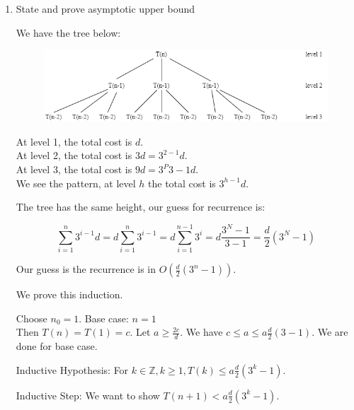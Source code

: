 \documentclass{cpsc413Solutions}
\begin{document}
\begin{problemlist}
\begin{problem}
\begin{problem}
\begin{answer}
\begin{enumerate}
    which means:
    \begin{align*}
    T[i,j] = 
        \begin{cases}
         c  &\text{if $j=1$}\\
        \\
       3T(n-1) + d & \text{otherwise}
        \end{cases}
    \end{align*}
    
    \newpage
    \item State and prove asymptotic upper bound
    
    We have the tree below:
    \begin{figure}[htp]
        \centering
        \includegraphics[width=15cm]{ProbSet6.png}
    \end{figure}
    
    At level 1, the total cost is $d$.\\
    At level 2, the total cost is $3d = 3^{2-1}d$.\\
    At level 3, the total cost is $9d = 3^P{3-1}d$.\\
    
    We see the pattern, at level $h$ the total cost is $3^{h-1}d$. 
    
    The tree has the same height, our guess for recurrence is:
    
    $$\sum_{i=1}^{n} 3^{i-1}d = d \sum_{i=1}^n3^{i-1}= d \sum_{i=1}^{n-1}3^{i}= d \frac{3^{N}-1}{3-1} = \frac{d}{2}(3^N-1)$$
    
    Our guess is the recurrence is in $O(\frac{d}{2}(3^n-1))$.
    
    We prove this induction.
    
    Choose $n_0 = 1$.
    Base case: $n = 1$\\
    Then $T(n) = T(1) =c$. Let $a \geq \frac{2c}{d}$. We have $c\leq a \leq a\frac{d}{2}(3-1)$. We are done for base case.

    Inductive Hypothesis: For $k \in \mathds{Z}, k \geq 1, T(k) \leq a\frac{d}{2}(3^{k}-1)$.
    
    Inductive Step: We want to show $T(n+1) < a\frac{d}{2}(3^k-1)$.
    

\end{enumerate}
\end{answer}
\end{problem}
\end{problem}
\end{problemlist}
\end{document}
